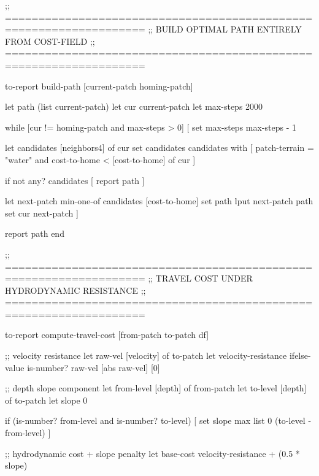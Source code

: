 \documentclass[
]{book}
\newenvironment{Shaded}{\begin{snugshade}}{\end{snugshade}}
\newcommand{\NormalTok}[1]{#1}
\begin{document}
\begin{Shaded}
\begin{Highlighting}[]
\NormalTok{;; ===================================================================}
\NormalTok{;;  BUILD OPTIMAL PATH ENTIRELY FROM COST{-}FIELD}
\NormalTok{;; ===================================================================}

\NormalTok{to{-}report build{-}path [current{-}patch homing{-}patch]}

\NormalTok{  let path (list current{-}patch)}
\NormalTok{  let cur current{-}patch}
\NormalTok{  let max{-}steps 2000}

\NormalTok{  while [cur != homing{-}patch and max{-}steps \textgreater{} 0] [}
\NormalTok{    set max{-}steps max{-}steps {-} 1}

\NormalTok{    let candidates [neighbors4] of cur}
\NormalTok{    set candidates candidates with [}
\NormalTok{      patch{-}terrain = "water" and}
\NormalTok{      cost{-}to{-}home \textless{} [cost{-}to{-}home] of cur}
\NormalTok{    ]}

\NormalTok{    if not any? candidates [}
\NormalTok{      report path}
\NormalTok{    ]}

\NormalTok{    let next{-}patch min{-}one{-}of candidates [cost{-}to{-}home]}
\NormalTok{    set path lput next{-}patch path}
\NormalTok{    set cur next{-}patch}
\NormalTok{  ]}

\NormalTok{  report path}
\NormalTok{end}


\NormalTok{;; ===================================================================}
\NormalTok{;;  TRAVEL COST UNDER HYDRODYNAMIC RESISTANCE}
\NormalTok{;; ===================================================================}

\NormalTok{to{-}report compute{-}travel{-}cost [from{-}patch to{-}patch df]}

\NormalTok{  ;; velocity resistance}
\NormalTok{  let raw{-}vel [velocity] of to{-}patch}
\NormalTok{  let velocity{-}resistance }
\NormalTok{      ifelse{-}value is{-}number? raw{-}vel [abs raw{-}vel] [0]}

\NormalTok{  ;; depth slope component}
\NormalTok{  let from{-}level [depth] of from{-}patch}
\NormalTok{  let to{-}level   [depth] of to{-}patch}
\NormalTok{  let slope 0}

\NormalTok{  if (is{-}number? from{-}level and is{-}number? to{-}level) [}
\NormalTok{    set slope max list 0 (to{-}level {-} from{-}level)}
\NormalTok{  ]}

\NormalTok{  ;; hydrodynamic cost + slope penalty}
\NormalTok{  let base{-}cost velocity{-}resistance + (0.5 * slope)}


\end{Highlighting}
\end{Shaded}
\end{document}
